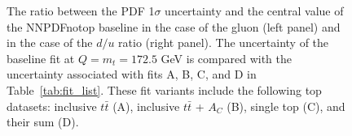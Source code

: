 \documentclass[withindex,glossary]{cam-thesis}
\begin{document}
\begin{figure}[t]
\centering
        \caption{The ratio between the PDF 1$\sigma$ uncertainty and the
          central value of the NNPDFnotop baseline in the case of the gluon
          (left panel) and in the case of the $d/u$ ratio (right panel).
          The uncertainty of  the  baseline fit at $Q=m_t=172.5$ GeV
          is compared with the uncertainty associated with fits A, B, C, and
          D in Table~\ref{tab:fit_list}.
          These fit variants include the following top datasets:  inclusive $t\bar{t}$ (A),
          inclusive $t\bar{t}$ + $A_C$ (B), single top (C), and their sum (D).}
\label{fig:fitABCD}
\end{figure}
\end{document}
